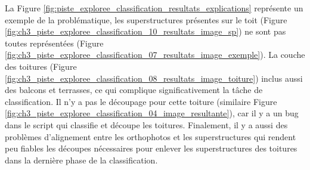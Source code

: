 La Figure \ref{fig:piste_exploree_classification_resultats_explications} représente un exemple de la problématique, les superstructures présentes sur le toit (Figure \ref{fig:ch3_piste_exploree_classification_10_resultats_image_sp}) ne sont pas toutes représentées (Figure \ref{fig:ch3_piste_exploree_classification_07_resultats_image_exemple}). La couche des toitures (Figure \ref{fig:ch3_piste_exploree_classification_08_resultats_image_toiture}) inclus aussi des balcons et terrasses, ce qui complique significativement la tâche de classification. Il n'y a pas le découpage pour cette toiture (similaire Figure \ref{fig:ch3_piste_exploree_classification_04_image_resultante}), car il y a un bug dans le script qui classifie et découpe les toitures. Finalement, il y a aussi des problèmes d’alignement entre les orthophotos et les superstructures qui rendent peu fiables les découpes nécessaires pour enlever les superstructures des toitures dans la dernière phase de la classification.

